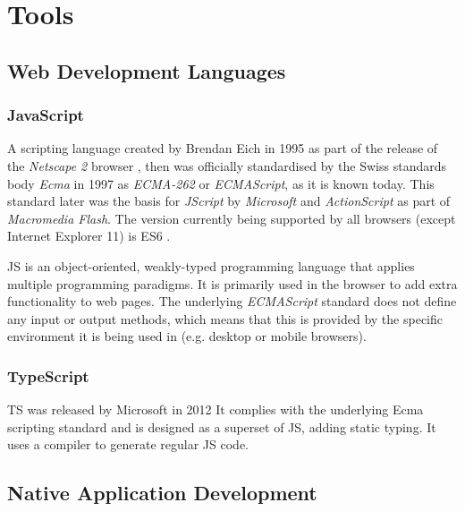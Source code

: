 \chapter{Tools}



\section{Web Development Languages}



\subsection{JavaScript}

A scripting language created by Brendan Eich in 1995 as part of the release of the \emph{Netscape 2} browser \parencite{javascriptRelease}, then was officially standardised by the Swiss standards body \emph{Ecma} in 1997 as \emph{ECMA-262} or \emph{ECMAScript}, as it is known today. This standard later was the basis for \emph{JScript} by \emph{Microsoft} and \emph{ActionScript} as part of \emph{Macromedia Flash}. The version currently being supported by all browsers (except Internet Explorer 11) is \ac{ES6} \parencite{javascriptHistory}.

\ac{JS} is an object-oriented, weakly-typed programming language that applies multiple programming paradigms. It is primarily used in the browser to add extra functionality to web pages. The underlying \emph{ECMAScript} standard does not define any input or output methods, which means that this is provided by the specific environment it is being used in (e.g. desktop or mobile browsers).

\subsection{TypeScript}

\ac{TS} was released by Microsoft in 2012  It complies with the underlying Ecma scripting standard and is designed as a superset of \ac{JS}, adding static typing. It uses a compiler to generate regular \ac{JS} code.


\section{Native Application Development}

